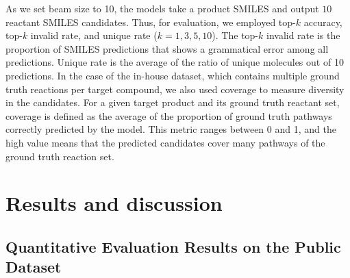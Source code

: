 \documentclass[journal=jacsat,manuscript=article]{achemso}
\begin{document}
	As we set beam size to 10, the models take a product SMILES and output $10$ reactant SMILES candidates. Thus, for evaluation, we employed top-$k$ accuracy, top-$k$ invalid rate, and unique rate ($k=1,3,5,10$). The top-$k$ invalid rate is the proportion of SMILES predictions that shows a grammatical error among all predictions. Unique rate is the average of the ratio of unique molecules out of 10 predictions. In the case of the in-house dataset, which contains multiple ground truth reactions per target compound, we also used coverage to measure diversity in the candidates. For a given target product and its ground truth reactant set, coverage is defined as the average of the proportion of ground truth pathways correctly predicted by the model. This metric ranges between 0 and 1, and the high value means that the predicted candidates cover many pathways of the ground truth reaction set.


\section{Results and discussion}

	\subsection{Quantitative Evaluation Results on the Public Dataset}
	
\end{document}
